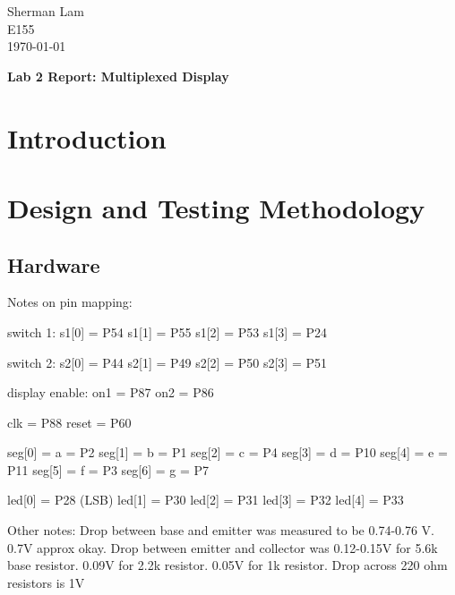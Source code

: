 \documentclass[11pt]{article}
\begin{document}
\begin{flushleft}
Sherman Lam
\\E155
\\ \today
\end{flushleft}


\begin{center}
\begin{Large}
\textbf{Lab 2 Report: Multiplexed Display}
\end{Large}
\end{center}




\section{Introduction}
\label{sec:intro}



\section{Design and Testing Methodology}

\subsection{Hardware}

Notes on pin mapping:

switch 1:
s1[0] = P54
s1[1] = P55
s1[2] = P53
s1[3] = P24

switch 2:
s2[0] = P44
s2[1] = P49
s2[2] = P50
s2[3] = P51

display enable:
on1 = P87
on2 = P86

clk = P88
reset = P60

seg[0] = a = P2
seg[1] = b = P1
seg[2] = c = P4
seg[3] = d = P10
seg[4] = e = P11
seg[5] = f = P3
seg[6] = g = P7

led[0] = P28		(LSB)
led[1] = P30
led[2] = P31
led[3] = P32
led[4] = P33



Other notes:
Drop between base and emitter was measured to be 0.74-0.76 V. 0.7V approx okay.
Drop between emitter and collector was 0.12-0.15V for 5.6k base resistor. 0.09V for 2.2k resistor. 0.05V for 1k resistor. 
Drop across 220 ohm resistors is 1V
\end{document}
